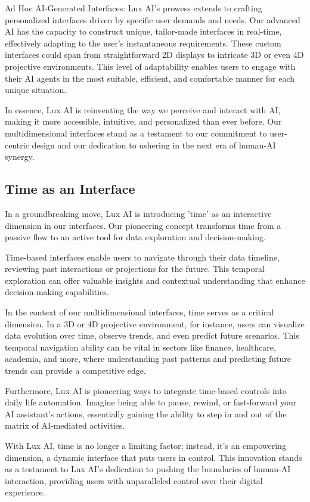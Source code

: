 \documentclass[11pt]{article}
\begin{document}
Ad Hoc AI-Generated Interfaces: Lux AI's prowess extends to crafting personalized interfaces driven by specific user demands and needs. Our advanced AI has the capacity to construct unique, tailor-made interfaces in real-time, effectively adapting to the user's instantaneous requirements. These custom interfaces could span from straightforward 2D displays to intricate 3D or even 4D projective environments. This level of adaptability enables users to engage with their AI agents in the most suitable, efficient, and comfortable manner for each unique situation.


In essence, Lux AI is reinventing the way we perceive and interact with AI, making it more accessible, intuitive, and personalized than ever before. Our multidimensional interfaces stand as a testament to our commitment to user-centric design and our dedication to ushering in the next era of human-AI synergy.


\subsection{Time as an Interface}

In a groundbreaking move, Lux AI is introducing 'time' as an interactive dimension in our interfaces. Our pioneering concept transforms time from a passive flow to an active tool for data exploration and decision-making.


Time-based interfaces enable users to navigate through their data timeline, reviewing past interactions or projections for the future. This temporal exploration can offer valuable insights and contextual understanding that enhance decision-making capabilities.


In the context of our multidimensional interfaces, time serves as a critical dimension. In a 3D or 4D projective environment, for instance, users can visualize data evolution over time, observe trends, and even predict future scenarios. This temporal navigation ability can be vital in sectors like finance, healthcare, academia, and more, where understanding past patterns and predicting future trends can provide a competitive edge.


Furthermore, Lux AI is pioneering ways to integrate time-based controls into daily life automation. Imagine being able to pause, rewind, or fast-forward your AI assistant's actions, essentially gaining the ability to step in and out of the matrix of AI-mediated activities.


With Lux AI, time is no longer a limiting factor; instead, it's an empowering dimension, a dynamic interface that puts users in control. This innovation stands as a testament to Lux AI's dedication to pushing the boundaries of human-AI interaction, providing users with unparalleled control over their digital experience.
\end{document}

